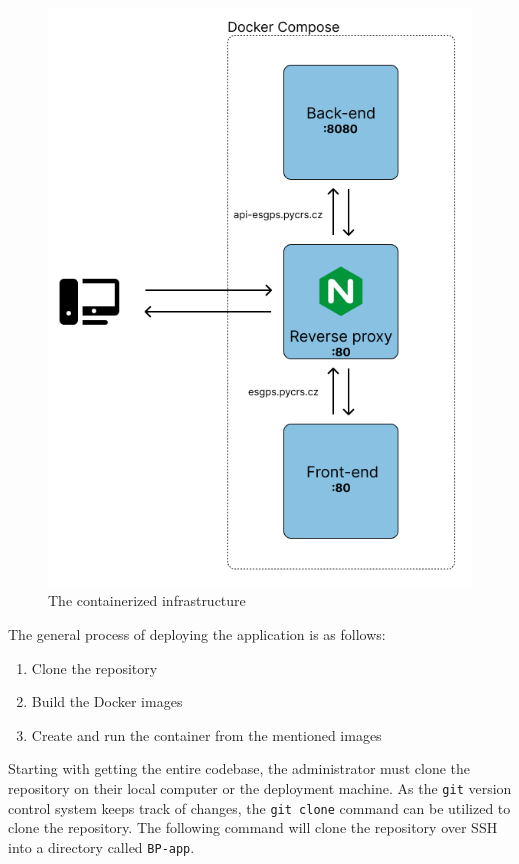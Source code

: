 \documentclass[FM,BP,EN,fonts]{tulthesis}
\begin{document}
\begin{figure}[H]
    \centering
    \includegraphics[scale=.6]{media/orchestration.png}
    \caption{The containerized infrastructure}
    \label{fig:compose-structure}
\end{figure}

The general process of deploying the application is as follows:

\begin{enumerate}
    \item Clone the repository
    \item Build the Docker images
    \item Create and run the container from the mentioned images
\end{enumerate}

Starting with getting the entire codebase, the administrator must clone the repository on their local computer or the deployment machine. As the \verb|git| version control system keeps track of changes, the \verb|git clone| command can be utilized to clone the repository. The following command will clone the repository over SSH into a directory called \verb|BP-app|.
\end{document}
